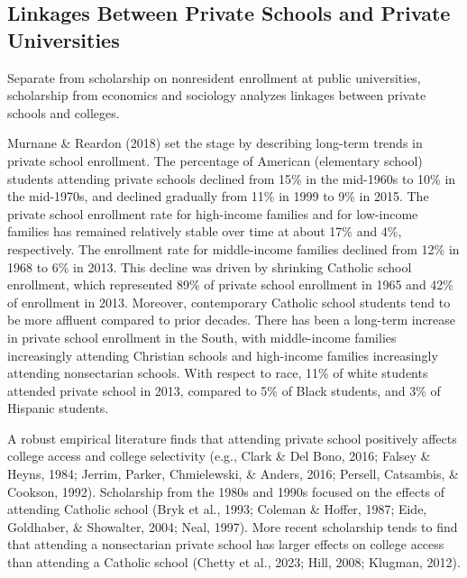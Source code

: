 \documentclass[
  12pt,
]{article}
\begin{document}
\subsection{Linkages Between Private Schools and Private Universities}\label{linkages-between-private-schools-and-private-universities}

Separate from scholarship on nonresident enrollment at public universities, scholarship from economics and sociology analyzes linkages between private schools and colleges.

Murnane \& Reardon (2018) set the stage by describing long-term trends in private school enrollment. The percentage of American (elementary school) students attending private schools declined from 15\% in the mid-1960s to 10\% in the mid-1970s, and declined gradually from 11\% in 1999 to 9\% in 2015. The private school enrollment rate for high-income families and for low-income families has remained relatively stable over time at about 17\% and 4\%, respectively. The enrollment rate for middle-income families declined from 12\% in 1968 to 6\% in 2013. This decline was driven by shrinking Catholic school enrollment, which represented 89\% of private school enrollment in 1965 and 42\% of enrollment in 2013. Moreover, contemporary Catholic school students tend to be more affluent compared to prior decades. There has been a long-term increase in private school enrollment in the South, with middle-income families increasingly attending Christian schools and high-income families increasingly attending nonsectarian schools. With respect to race, 11\% of white students attended private school in 2013, compared to 5\% of Black students, and 3\% of Hispanic students.

A robust empirical literature finds that attending private school positively affects college access and college selectivity (e.g., Clark \& Del Bono, 2016; Falsey \& Heyns, 1984; Jerrim, Parker, Chmielewski, \& Anders, 2016; Persell, Catsambis, \& Cookson, 1992). Scholarship from the 1980s and 1990s focused on the effects of attending Catholic school (Bryk et al., 1993; Coleman \& Hoffer, 1987; Eide, Goldhaber, \& Showalter, 2004; Neal, 1997). More recent scholarship tends to find that attending a nonsectarian private school has larger effects on college access than attending a Catholic school (Chetty et al., 2023; Hill, 2008; Klugman, 2012).
\end{document}
